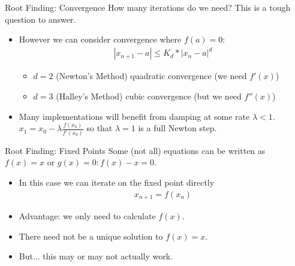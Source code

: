 \begin{frame}{Root Finding: Convergence}
How many iterations do we need? This is a tough question to answer.
\begin{itemize}
\item However we can consider convergence where $f(a) =0$:
\begin{align*}
\left|x_{n+1}-a\right| \leq K_d *\left|x_{n}-a\right|^{d}
\end{align*}
\begin{itemize}
\item $d=2$ (Newton's Method) \alert{quadratic convergence}  (we need $f'(x)$)
\item $d=3$ (Halley's Method) \alert{cubic convergence} (but we need $f''(x)$)
\end{itemize}
\item Many implementations will benefit from damping at some rate $\lambda <1$. $x_1 = x_0-\lambda \frac{f(x_0)}{f'(x_0)} $ so that $\lambda=1$ is a \alert{full Newton step}.
\end{itemize}
\end{frame}

\begin{frame}{Root Finding: Fixed Points}
Some (not all) equations can be written as $f(x) = x$ or $g(x)=0: f(x)-x =0$.
\begin{itemize}
\item In this case we can iterate on the \alert{fixed point} directly
\begin{align*}
x_{n+1} = f(x_n)
\end{align*}
\item Advantage: we only need to calculate $f(x)$.
\item There need not be a unique solution to $f(x) = x$.
\item But... this may or may not actually work.
\end{itemize}
\end{frame}

